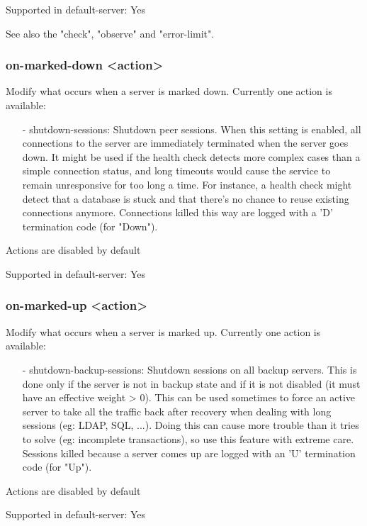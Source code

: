   Supported in default-server: Yes

  See also the "check", "observe" and "error-limit".

\subsubsection[on-marked-down]{on-marked-down <action>}
  Modify what occurs when a server is marked down.
  Currently one action is available:
  \begin{itemize}
  \item[-] shutdown-sessions: Shutdown peer sessions. When this setting is enabled,
    all connections to the server are immediately terminated when the server
    goes down. It might be used if the health check detects more complex cases
    than a simple connection status, and long timeouts would cause the service
    to remain unresponsive for too long a time. For instance, a health check
    might detect that a database is stuck and that there's no chance to reuse
    existing connections anymore. Connections killed this way are logged with
    a 'D' termination code (for "Down").
  \end{itemize}

  Actions are disabled by default

  Supported in default-server: Yes

\subsubsection[on-marked-up]{on-marked-up <action>}
  Modify what occurs when a server is marked up.
  Currently one action is available:
  \begin{itemize}
  \item[-] shutdown-backup-sessions: Shutdown sessions on all backup servers. This is
    done only if the server is not in backup state and if it is not disabled
    (it must have an effective weight > 0). This can be used sometimes to force
    an active server to take all the traffic back after recovery when dealing
    with long sessions (eg: LDAP, SQL, ...). Doing this can cause more trouble
    than it tries to solve (eg: incomplete transactions), so use this feature
    with extreme care. Sessions killed because a server comes up are logged
    with an 'U' termination code (for "Up").
  \end{itemize}

  Actions are disabled by default

  Supported in default-server: Yes


